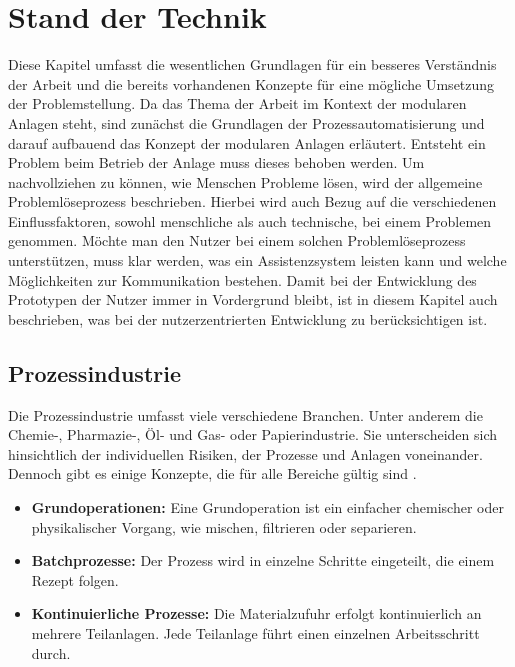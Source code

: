 
\chapter{Stand der Technik}
\label{sec:StandDerTechnik}
Diese Kapitel umfasst die wesentlichen Grundlagen für ein besseres Verständnis der Arbeit und die bereits vorhandenen Konzepte für eine mögliche Umsetzung der Problemstellung. Da das Thema der Arbeit im Kontext der modularen Anlagen steht, sind zunächst die Grundlagen der Prozessautomatisierung und darauf aufbauend das Konzept der modularen Anlagen erläutert. Entsteht ein Problem beim Betrieb der Anlage muss dieses behoben werden. Um nachvollziehen zu können, wie Menschen Probleme lösen, wird der allgemeine Problemlöseprozess beschrieben. Hierbei wird auch Bezug auf die verschiedenen Einflussfaktoren, sowohl menschliche als auch technische, bei einem Problemen genommen. Möchte man den Nutzer bei einem solchen Problemlöseprozess unterstützen, muss klar werden, was ein Assistenzsystem leisten kann und welche Möglichkeiten zur Kommunikation bestehen. Damit bei der Entwicklung des Prototypen der Nutzer immer in Vordergrund bleibt, ist in diesem Kapitel auch beschrieben, was bei der nutzerzentrierten Entwicklung zu berücksichtigen ist.

\section{Prozessindustrie}
Die Prozessindustrie umfasst viele verschiedene Branchen. Unter anderem die Chemie-, Pharmazie-, Öl- und Gas- oder Papierindustrie. Sie unterscheiden sich hinsichtlich der individuellen Risiken, der Prozesse und Anlagen voneinander. Dennoch gibt es einige Konzepte, die für alle Bereiche gültig sind \cite{UrbasP2012}.
\begin{itemize}
\item \textbf{Grundoperationen:} Eine Grundoperation ist ein einfacher chemischer oder physikalischer Vorgang, wie mischen, filtrieren oder separieren.
\item \textbf{Batchprozesse:} Der Prozess wird in einzelne Schritte eingeteilt, die einem Rezept folgen.
\item \textbf{Kontinuierliche Prozesse:} Die Materialzufuhr erfolgt kontinuierlich an mehrere Teilanlagen. Jede Teilanlage führt einen einzelnen Arbeitsschritt durch.
\end{itemize}

